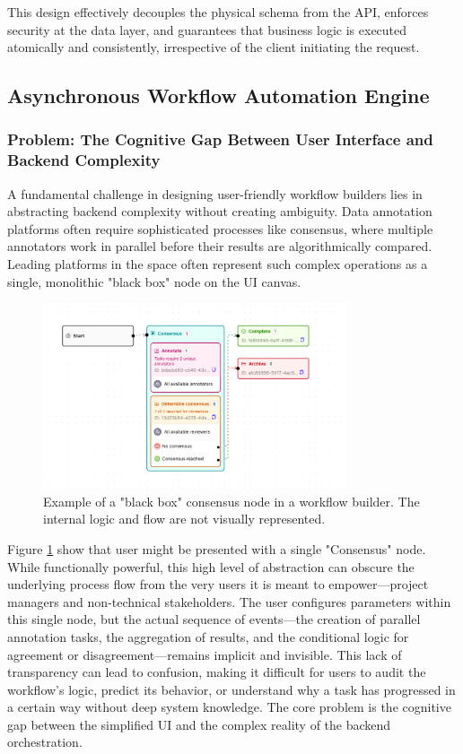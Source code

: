 This design effectively decouples the physical schema from the API, enforces security at the data layer, and guarantees that business logic is executed atomically and consistently, irrespective of the client initiating the request.

\subsection{Asynchronous Workflow Automation Engine}
\label{subsec:workflow_automation}

\subsubsection{Problem: The Cognitive Gap Between User Interface and Backend Complexity}
A fundamental challenge in designing user-friendly workflow builders lies in abstracting backend complexity without creating ambiguity. Data annotation platforms often require sophisticated processes like consensus, where multiple annotators work in parallel before their results are algorithmically compared. Leading platforms in the space often represent such complex operations as a single, monolithic "black box" node on the UI canvas.
\begin{figure}[H]
    \centering
    \includegraphics[width=0.8\textwidth]{content/resources/images/chap4-system-design/blackbox.png}
    \caption{Example of a "black box" consensus node in a workflow builder. The internal logic and flow are not visually represented.}
    \label{fig:blackbox_ui}
\end{figure}

Figure \ref{fig:blackbox_ui} show that user might be presented with a single "Consensus" node. While functionally powerful, this high level of abstraction can obscure the underlying process flow from the very users it is meant to empower—project managers and non-technical stakeholders. The user configures parameters within this single node, but the actual sequence of events—the creation of parallel annotation tasks, the aggregation of results, and the conditional logic for agreement or disagreement—remains implicit and invisible. This lack of transparency can lead to confusion, making it difficult for users to audit the workflow's logic, predict its behavior, or understand why a task has progressed in a certain way without deep system knowledge. The core problem is the cognitive gap between the simplified UI and the complex reality of the backend orchestration.


